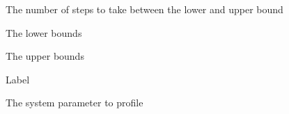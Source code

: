 
 {The number of steps to take between the lower and upper bound}

 {The lower bounds}

 {The upper bounds}

 {Label}

 {The system parameter to profile}

